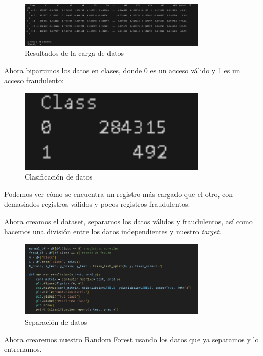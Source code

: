\documentclass{article}
\begin{document}
\begin{figure}[H]
    \centering
    \includegraphics[width=0.8\textwidth]{img/3.png}
    \caption{Resultados de la carga de datos}
\end{figure}

Ahora bipartimos los datos en clases, donde 0 es un acceso válido y 1 es un acceso fraudulento:

\begin{figure}[H]
    \centering
    \includegraphics[width=0.8\textwidth]{img/4.png}
    \caption{Clasificación de datos}
\end{figure}

Podemos ver cómo se encuentra un registro más cargado que el otro, con demasiados registros válidos y pocos registros fraudulentos.

Ahora creamos el dataset, separamos los datos válidos y fraudulentos, así como hacemos una división entre los datos independientes y nuestro \textit{target}.

\begin{figure}[H]
    \centering
    \includegraphics[width=0.8\textwidth]{img/5.png}
    \caption{Separación de datos}
\end{figure}

Ahora crearemos nuestro Random Forest usando los datos que ya separamos y lo entrenamos.
\end{document}
